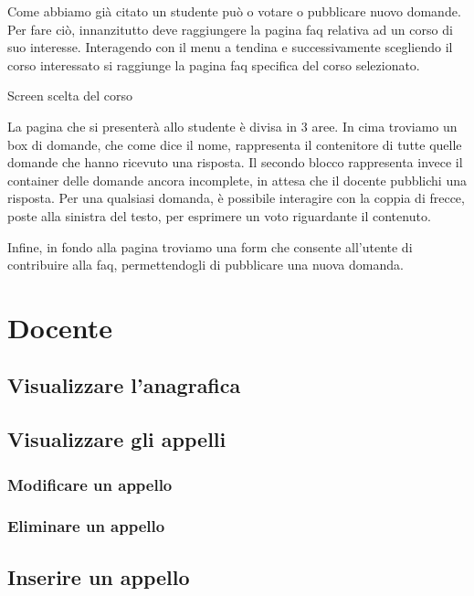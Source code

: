 \documentclass [a4paper,11pt]{book}
\begin{document}
Come abbiamo già citato un studente può o votare o pubblicare nuovo domande. Per fare ciò, innanzitutto deve raggiungere la pagina faq relativa ad un corso di suo interesse. Interagendo con il menu a tendina e successivamente scegliendo il corso interessato si raggiunge la pagina faq specifica del corso selezionato.

Screen scelta del corso

La pagina che si presenterà allo studente è divisa in 3 aree. In cima troviamo un box di domande, che come dice il nome, rappresenta il contenitore di tutte quelle domande che hanno ricevuto una risposta. Il secondo blocco rappresenta invece il container delle domande ancora incomplete, in attesa che il docente pubblichi una risposta. Per una qualsiasi domanda, è possibile interagire con la coppia di frecce, poste alla sinistra del testo, per esprimere un voto riguardante il contenuto.

Infine, in fondo alla pagina troviamo una form che consente all'utente di contribuire alla faq, permettendogli di pubblicare una nuova domanda. 
\medskip

\section{Docente}

\subsection{Visualizzare l'anagrafica}

\medskip

\subsection{Visualizzare gli appelli}


\subsubsection{Modificare un appello}

\medskip

\subsubsection{Eliminare un appello}

\medskip

\subsection{Inserire un appello}
\end{document}
